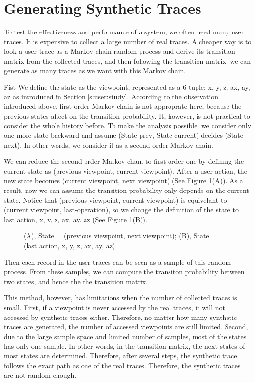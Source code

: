 \section{Generating Synthetic Traces}
To test the effectiveness and performance of a system, we often need many user traces. 
It is expensive to collect a large number 
of real traces. 
A cheaper way is to look a user trace as a Markov chain random process
and derive its transition matrix from the collected traces, and then following the transition
matrix, we can generate as many traces as we want with this Markov chain.

Fist We define the state as the viewpoint, represented as a 6-tuple: {x, y, z, ax, ay, az}
as introduced in Section \ref{s:user:study}.
According to the observation introduced above, first order Markov chain is not approprate here, because
the previous states affect on the transition probability. 
It, however, is not practical to consider the whole history before. 
To make the analysis possible, we consider only one more state backward and assume
(State-prev, State-current) decides (State-next). In other words, we consider it as a second order Markov chain. 

We can reduce the second order Markov chain to first order one by defining the current state as
(previous viewpoint, current viewpoint). After a user action, the new state becomes 
(current viewpoint, next viewpoint) (See Figure \ref{f:user:reduction}(A)). 
As a result, now we can assume the transition probability only depends on the current state.
Notice that (previous viewpoint, current viewpoint) is equivelant to (current viewpoint, last-operation), 
so we change the definition of the state to {last action, x, y, z, ax, ay, az} 
(See Figure \ref{f:user:reduction}(B)).
\begin{figure}
    \centering
    \caption{(A), State = (previous viewpoint, next viewpoint); (B), State = (last action, x, y, z, ax, ay, az)}
    \label{f:user:reduction}
\end{figure}

Then each record in the user traces can be seen as a sample of this random process.
From these samples, we can compute the transiton probability between two states, and hence
the the transition matrix.

This method, however, has limitations when the number of collected traces is small. First, if a viewpoint is 
never accessed by the real traces, it will not accessed by synthetic traces either. Therefore, no matter how
many synthetic traces are generated, the number of accessed viewpoints are still limited. Second, due to
the large sample space and limited number of samples, most of the states has only one sample. 
In other words, in the transition matrix, the next states of most states are determined. 
Therefore, after several steps, the synthetic trace follows the exact path as one of the real traces. 
Therefore, the synthetic traces are not random enough.

